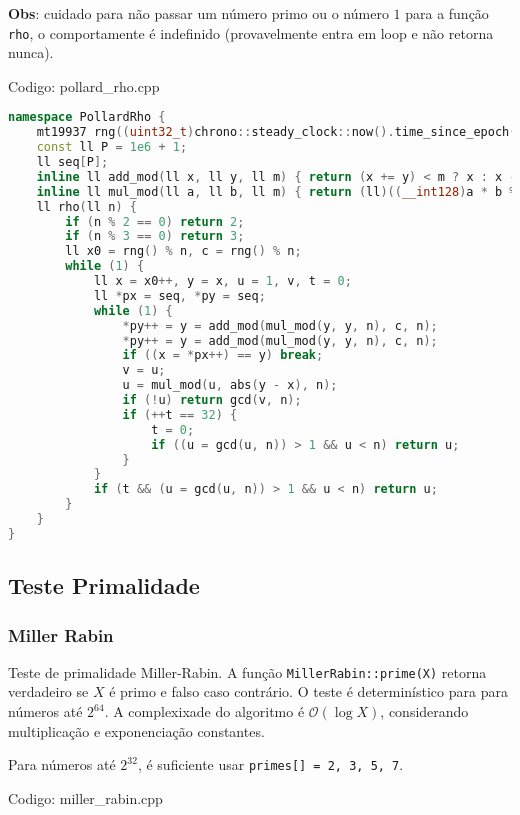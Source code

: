 \documentclass[10pt, a4paper, oneside]{book}
\begin{document}
\textbf{Obs}: cuidado para não passar um número primo ou o número $1$ para a função \texttt{rho}, o comportamente é indefinido (provavelmente entra em loop e não retorna nunca).

\hfill

Codigo: pollard\_rho.cpp

\begin{lstlisting}[language=C++]
namespace PollardRho {
    mt19937 rng((uint32_t)chrono::steady_clock::now().time_since_epoch().count());
    const ll P = 1e6 + 1;
    ll seq[P];
    inline ll add_mod(ll x, ll y, ll m) { return (x += y) < m ? x : x - m; }
    inline ll mul_mod(ll a, ll b, ll m) { return (ll)((__int128)a * b % m); }
    ll rho(ll n) {
        if (n % 2 == 0) return 2;
        if (n % 3 == 0) return 3;
        ll x0 = rng() % n, c = rng() % n;
        while (1) {
            ll x = x0++, y = x, u = 1, v, t = 0;
            ll *px = seq, *py = seq;
            while (1) {
                *py++ = y = add_mod(mul_mod(y, y, n), c, n);
                *py++ = y = add_mod(mul_mod(y, y, n), c, n);
                if ((x = *px++) == y) break;
                v = u;
                u = mul_mod(u, abs(y - x), n);
                if (!u) return gcd(v, n);
                if (++t == 32) {
                    t = 0;
                    if ((u = gcd(u, n)) > 1 && u < n) return u;
                }
            }
            if (t && (u = gcd(u, n)) > 1 && u < n) return u;
        }
    }
}\end{lstlisting}
\hfill

\subsection{Teste Primalidade}
\subsubsection{Miller Rabin}


Teste de primalidade Miller-Rabin. A função \texttt{MillerRabin::prime(X)} retorna verdadeiro se $X$ é primo e falso caso contrário. O teste é determinístico para para números até $2^{64}$. A complexixade do algoritmo é $\mathcal{O}(\log X)$, considerando multiplicação e exponenciação constantes.



Para números até $2^{32}$, é suficiente usar \texttt{primes[] = {2, 3, 5, 7}}.
\hfill

Codigo: miller\_rabin.cpp
\end{document}
